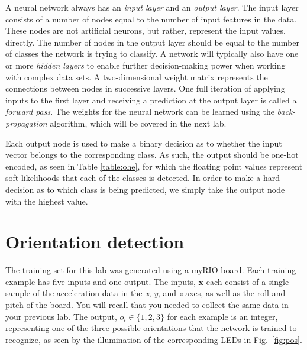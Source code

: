 \documentclass{article}
\begin{document}
A neural network always has an \textit{input layer} and an \textit{output layer}. The input layer consists of a number of nodes equal to the number of input features in the data.  These nodes are not artificial neurons, but rather, represent the input values, directly.  The number of nodes in the output layer should be equal to the number of classes the network is trying to classify. 
A network will typically also have one or more \textit{hidden layers} to enable further decision-making power when working with complex data sets. 
A two-dimensional weight matrix represents the connections between nodes in successive layers. One full iteration of applying inputs to the first layer and receiving a prediction at the output layer is called a \textit{forward pass}. The weights for the neural network can be learned using the \textit{back-propagation} algorithm, which will be covered in the next lab. 

Each output node is used to make a binary decision as to whether the input vector belongs to the corresponding class. As such, the output should be one-hot encoded, as seen in Table \ref{table:ohe}, for which the floating point values represent soft likelihoods that each of the classes is detected. In order to make a hard decision as to which class is being predicted, we simply take the output node with the highest value. 

\section{Orientation detection}

The training set for this lab was generated using a myRIO board. Each training example has five inputs and one output. The inputs, $\mathbf{x}$ each consist of a single sample of the acceleration data in the \textit{x}, \textit{y}, and \textit{z} axes, as well as the roll and pitch of the board. You will recall that you needed to collect the same data in your previous lab. The output, $o_i \in \{1,2,3\}$ for each example is an integer, representing one of the three possible orientations that the network is trained to recognize, as seen by the illumination of the corresponding LEDs in Fig.~\ref{fig:pos}.
\end{document}
